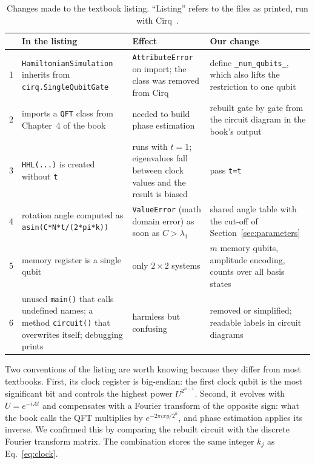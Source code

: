 \documentclass[manuscript,screen,review,nonacm]{acmart}
\newcommand{\code}[1]{\texttt{#1}}
\begin{document}
\begin{table}[t]
  \caption{Changes made to the textbook listing. ``Listing'' refers to the
    files as printed, run with Cirq~\VerCirq.}
  \label{tab:repairs}
  \small
  \begin{tabular}{p{0.3cm}L{4.9cm}L{4.2cm}L{4.3cm}}
    \toprule
     & In the listing & Effect & Our change \\
     & \code{HamiltonianSimulation} inherits from \code{cirq.SingleQubitGate}
      & \code{AttributeError} on import; the class was removed from Cirq
      & define \code{\_num\_qubits\_}, which also lifts the restriction to one qubit \\
    2 & imports a \code{QFT} class from Chapter~4 of the book
      & needed to build phase estimation
      & rebuilt gate by gate from the circuit diagram in the book's output \\
    3 & \code{HHL(...)} is created without \code{t}
      & runs with $t=1$; eigenvalues fall between clock values and the result is biased
      & pass \code{t=t} \\
    4 & rotation angle computed as \code{asin(C*N*t/(2*pi*k))}
      & \code{ValueError} (math domain error) as soon as $C>\lambda_1$
      & shared angle table with the cut-off of Section~\ref{sec:parameters} \\
    5 & memory register is a single qubit
      & only $2\times 2$ systems
      & $m$ memory qubits, amplitude encoding, counts over all basis states \\
    6 & unused \code{main()} that calls undefined names; a method \code{circuit()}
        that overwrites itself; debugging prints
      & harmless but confusing
      & removed or simplified; readable labels in circuit diagrams \\
    \bottomrule
  \end{tabular}
\end{table}

Two conventions of the listing are worth knowing because they differ from
most textbooks. First, its clock register is big-endian: the first clock qubit
is the most significant bit and controls the highest power $U^{2^{n-1}}$.
Second, it evolves with $U=e^{-iAt}$ and compensates with a Fourier transform
of the opposite sign: what the book calls the QFT multiplies by
$e^{-2\pi i xy/2^n}$, and phase estimation applies its inverse. We confirmed
this by comparing the rebuilt circuit with the discrete Fourier transform
matrix. The combination stores the same integer $k_j$ as
Eq.~\eqref{eq:clock}.
\end{document}

